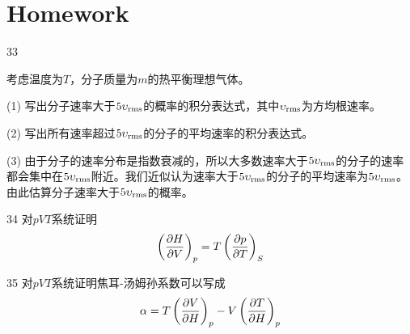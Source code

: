 \documentclass[CJK]{beamer}
\begin{document}
\section{Homework}

\begin{frame}
  \bch
  {\small
  \bitem
\item[33]{ 考虑温度为$T$，分子质量为$m$的热平衡理想气体。
  \bitem
\item[(1)]{写出分子速率大于$5\upsilon_{\rm rms}$的概率的积分表达式，其中$\upsilon_{\rm rms}$为方均根速率。}
\item[(2)] {写出所有速率超过$5\upsilon_{\rm rms}$的分子的平均速率的积分表达式。}
\item[(3)] {由于分子的速率分布是指数衰减的，所以大多数速率大于$5\upsilon_{\rm rms}$的分子的速率都会集中在$5\upsilon_{\rm rms}$附近。我们近似认为速率大于$5\upsilon_{\rm rms}$的分子的平均速率为$5\upsilon_{\rm rms}$。由此估算分子速率大于$5\upsilon_{\rm rms}$的概率。}
          \eitem
}
\item[34]{对$pVT$系统证明  $$\left(\frac{\partial H}{\partial V}\right)_{p} = T\left(\frac{\partial p}{\partial T}\right)_{S} $$}
\item[35]{对$pVT$系统证明焦耳-汤姆孙系数可以写成$$\alpha = T \left(\frac{\partial V}{\partial H}\right)_{p} - V\left(\frac{\partial T}{\partial H}\right)_{p}$$}
  \eitem
}
  
  \ech
\end{frame}
\end{document}
